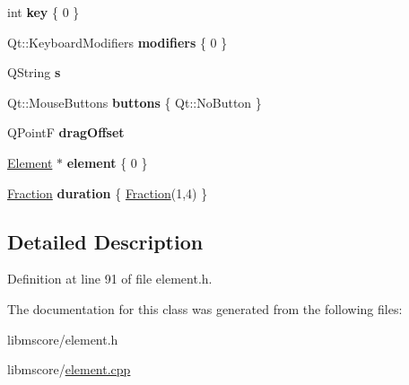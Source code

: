 \begin{DoxyCompactItemize}
\mbox{\label{class_ms_1_1_edit_data_a3cc8efe8f3f85e166731c277ec7a0add}} 
int {\bfseries key} \{ 0 \}
\item 
\mbox{\label{class_ms_1_1_edit_data_a26c28794b59dc81e5009ef7a15981784}} 
Qt\+::\+Keyboard\+Modifiers {\bfseries modifiers} \{ 0 \}
\item 
\mbox{\label{class_ms_1_1_edit_data_a4241dfcce43bf72302d363591cc1ceeb}} 
Q\+String {\bfseries s}
\item 
\mbox{\label{class_ms_1_1_edit_data_ae043d6d766f960834b81e33934a29959}} 
Qt\+::\+Mouse\+Buttons {\bfseries buttons} \{ Qt\+::\+No\+Button \}
\item 
\mbox{\label{class_ms_1_1_edit_data_a4ee5058f4c749a5e43896cd4264d5353}} 
Q\+PointF {\bfseries drag\+Offset}
\item 
\mbox{\label{class_ms_1_1_edit_data_a07230d29679583b1e4e23a7bfa4078ec}} 
\hyperlink{class_ms_1_1_element}{Element} $\ast$ {\bfseries element} \{ 0 \}
\item 
\mbox{\label{class_ms_1_1_edit_data_ac986a108fd5aba941fba32c7ac06efa8}} 
\hyperlink{class_ms_1_1_fraction}{Fraction} {\bfseries duration} \{ \hyperlink{class_ms_1_1_fraction}{Fraction}(1,4) \}
\end{DoxyCompactItemize}


\subsection{Detailed Description}


Definition at line 91 of file element.\+h.



The documentation for this class was generated from the following files\+:\begin{DoxyCompactItemize}
\item 
libmscore/element.\+h\item 
libmscore/\hyperlink{element_8cpp}{element.\+cpp}\end{DoxyCompactItemize}
